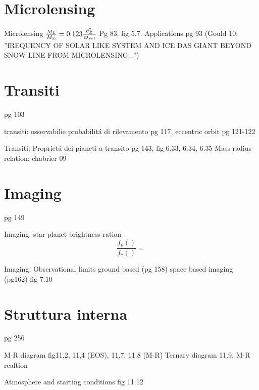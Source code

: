 \section{Microlensing}
\begin{workout}{Microlensing}
$\frac{M_L}{M_{\odot}{}}=0.123\frac{\theta_E^2}{\upvarpi_{rel}}$
Pg 83. fig 5.7. Applications pg 93
(Gould 10: ''fREQUENCY OF SOLAR LIKE SYSTEM AND ICE DAS GIANT BEYOND SNOW LINE FROM MICROLENSING...'')
\end{workout}
\section{Transiti}
pg 103
\begin{workout}{transiti: osservabilie probabilit\'a di rilevamento}
pg 117, eccentric orbit pg 121-122
\end{workout}
\begin{workout}{Transiti: Propriet\'a dei pianeti a transito}
pg 143, fig 6.33, 6.34, 6.35
Mass-radius relation: chabrier 09
\end{workout}

\section{Imaging}
pg 149
\begin{workout}{Imaging: star-planet brightness ration}
\begin{equation*}
\frac{f_p()}{f_*()}=
\end{equation*}
\end{workout}
\begin{workout}{Imaging: Observational limits}
ground based (pg 158) space based imaging (pg162)
fig 7.10
\end{workout}

\section{Struttura interna}

pg 256 
\begin{workout}{M-R diagram}
fig11.2, 11,4 (EOS), 11.7, 11.8 (M-R)
Ternary diagram 11.9, M-R realtion
\end{workout}

\begin{workout}{Atmosphere and starting conditions}
fig 11.12
\end{workout}
